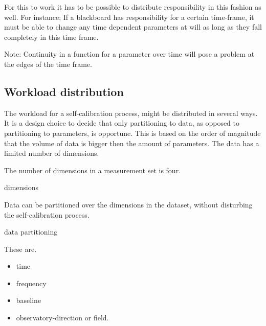 \documentclass[]{lofar}
\begin{document}
      For this to work it has to be possible to distribute
      responsibility in this fashion as well. For instance; If a
      blackboard has responsibility for a certain time-frame, it must
      be able to change any time dependent parameters at will as long
      as they fall completely in this time frame.
      \begin{em}\large{Note: }Continuity in a function for a parameter
      over time will pose a problem at the edges of the time
      frame.\end{em}

    \subsection{Workload distribution}
    \label{subsec:workload-distribution}\hypertarget{subsec:workload-distribution}{}%

      The workload for a self-calibration process, might be
      distributed in several ways. It is a design choice to decide
      that only partitioning to data, as opposed to partitioning to
      parameters, is opportune. This is based on the order of
      magnitude that the volume of data is bigger then the amount of
      parameters. The data has a limited number of dimensions.

      \begin{assumption}
        The number of dimensions in a measurement set is four.
        \caption{dimensions\label{ass:dimensions}}
      \end{assumption}

      \begin{assumption}
        Data can be partitioned over the dimensions in the dataset,
        without disturbing the self-calibration process.
        \caption{data partitioning\label{ass:partitioning}}
      \end{assumption}

      These are.

      \begin{itemize}

        \item 

          time

	\item 

          frequency

	\item 

          baseline

	\item 

          observatory-direction or field.

      \end{itemize}
\end{document}
